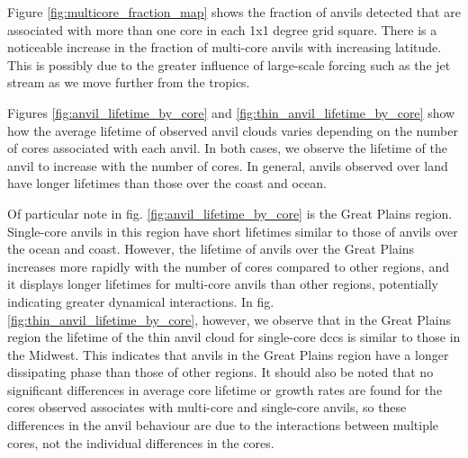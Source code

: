 Figure \ref{fig:multicore_fraction_map} shows the fraction of anvils detected that are associated with more than one core in each 1x1 degree grid square.
There is a noticeable increase in the fraction of multi-core anvils with increasing latitude.
This is possibly due to the greater influence of large-scale forcing such as the jet stream as we move further from the tropics.


Figures \ref{fig:anvil_lifetime_by_core} and \ref{fig:thin_anvil_lifetime_by_core} show how the average lifetime of observed anvil clouds varies depending on the number of cores associated with each anvil.
In both cases, we observe the lifetime of the anvil to increase with the number of cores.
In general, anvils observed over land have longer lifetimes than those over the coast and ocean.


Of particular note in fig. \ref{fig:anvil_lifetime_by_core} is the Great Plains region.
Single-core anvils in this region have short lifetimes similar to those of anvils over the ocean and coast.
However, the lifetime of anvils over the Great Plains increases more rapidly with the number of cores compared to other regions, and it displays longer lifetimes for multi-core anvils than other regions, potentially indicating greater dynamical interactions.
In fig. \ref{fig:thin_anvil_lifetime_by_core}, however, we observe that in the Great Plains region the lifetime of the thin anvil cloud for single-core \acrshort{dcc}s is similar to those in the Midwest.
This indicates that anvils in the Great Plains region have a longer dissipating phase than those of other regions.
It should also be noted that no significant differences in average core lifetime or growth rates are found for the cores observed associates with multi-core and single-core anvils, so these differences in the anvil behaviour are due to the interactions between multiple cores, not the individual differences in the cores.


